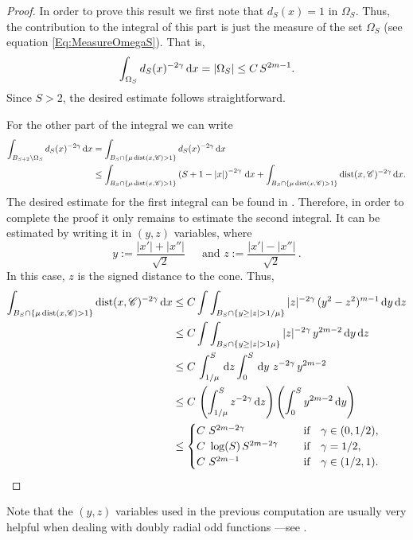 \begin{proof}
In order to prove this result we first note that $d_S(x)=1$ in $\Omega_S$. Thus, the contribution to the integral of this part is just the measure of the set $\Omega_S$ (see equation \eqref{Eq:MeasureOmegaS}). That is,
$$
\int_{\Omega_S} d_S(x)^{-2\gamma} \,\mathrm{d} x = |\Omega_S| \leq C\,S^{2m-1}.
$$
Since $S>2$, the desired estimate follows straightforward.

For the other part of the integral we can write
\begin{align*}
\int_{B_{S+2}\setminus \Omega_S} d_S(x)^{-2\gamma} \,\mathrm{d} x &= \int_{B_{S}\cap \{\mu \operatorname{dist}(x,\mathscr{C})>1\}} d_S(x)^{-2\gamma} \,\mathrm{d} x \\
& \leq \int_{B_{S}\cap \{\mu \operatorname{dist}(x,\mathscr{C})>1\}} \left( S+1-|x| \right)^{-2\gamma} \,\mathrm{d} x + \int_{B_{S}\cap \{\mu \operatorname{dist}(x,\mathscr{C})>1\}} \operatorname{dist}(x,\mathscr{C})^{-2\gamma} \,\mathrm{d} x.
\end{align*}
The desired estimate for the first integral can be found in \cite{SavinValdinoci-EnergyEstimate}. Therefore, in order to complete the proof it only remains to estimate the second integral. It can be estimated by writing it in $(y,z)$ variables, where
$$
y := \dfrac{|x'|+|x''|}{\sqrt{2}} \, \quad \text{ and } z := \dfrac{|x'|-|x''|}{\sqrt{2}}\,.
$$
In this case, $z$ is the signed distance to the cone. Thus,
\begin{align*}
\int_{B_{S}\cap \{\mu \dist(x,\ccal)>1\}} \dist(x,\ccal)^{-2\s} \d x &\leq C \int \int_{B_{S}\cap \{y\geq|z|>1/\mu\}} |z|^{-2\s} \, (y^2-z^2)^{m-1} \d y\d z \\
& \leq C \int \int_{B_{S}\cap \{y\geq|z|>1\mu\}} |z|^{-2\s} \, y^{2m-2} \d y\d z \\
& \leq C\, \int_{1/\mu}^S \d z \int_0^S \d y\ z^{-2\s} \, y^{2m-2} \\
& \leq C\, \left(\int_{1/\mu}^S z^{-2\s} \d z \right)  \left(  \int_0^S  y^{2m-2} \d y \right) \\
& \leq \begin{cases}
C \ S^{2m-2\s}\ \ \ \ &\textrm{if } \ \ \s\in(0,1/2),\\
C\ \log(S)\,S^{2m-2\s}\ \ \ \ &\textrm{if } \ \ \s=1/2,\\
C \ S^{2m-1}\ \ \ \ &\textrm{if } \ \ \s\in(1/2,1).\\
\end{cases}
\end{align*}
\end{proof}

Note that the $(y,z)$ variables used in the previous computation are usually very helpful when dealing with doubly radial odd functions ---see \cite{CabreTerraI, CabreTerraII, Cabre-Saddle, Cinti-Saddle,Cinti-Saddle2, Felipe-Sanz-Perela:SaddleFractional}.

